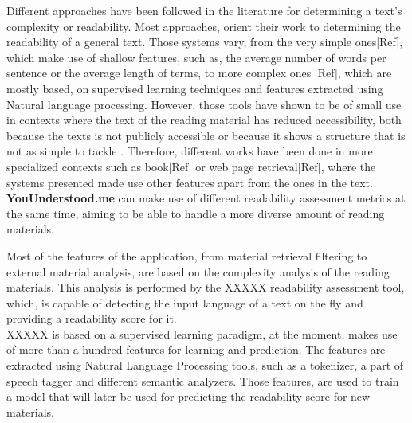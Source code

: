 \documentclass{sig-alternate-05-2015}
\begin{document}
Different approaches have been followed in the literature for determining a text's complexity or readability. Most approaches, orient their work to determining the readability of a general text. Those systems vary, from the very simple ones[Ref], which make use of shallow features, such as, the average number of words per sentence or the average length of terms, to more complex ones [Ref], which are mostly based, on supervised learning techniques and features extracted using Natural language processing. However, those tools have shown to be of small use in contexts where the text of the reading material has reduced accessibility, both because the texts is not publicly accessible or because it shows a structure that is not as simple to tackle . Therefore, different works have been done in more specialized contexts such as book[Ref] or web page retrieval[Ref], where the systems presented made use other features apart from the ones in the text.\\


\textbf{YouUnderstood.me} can make use of different readability assessment metrics at the same time, aiming to be able to handle a more diverse amount of reading materials. 







Most of the features of the application, from material retrieval filtering to external material analysis, are based on the complexity analysis of the reading materials. This analysis is performed by the {\color{red}XXXXX} \cite{imadrazo2016readability} readability assessment tool, which,  is capable of detecting the input language of a text on the fly and providing a readability score for it.\\

{\color{red}XXXXX} is based on a supervised learning paradigm, at the moment, makes use of more than a hundred features for learning and prediction. The features are extracted using Natural Language Processing tools, such as a tokenizer, a part of speech tagger and different semantic analyzers. Those features, are used to train a model that will later be used for predicting the readability score for new materials.
\end{document}
